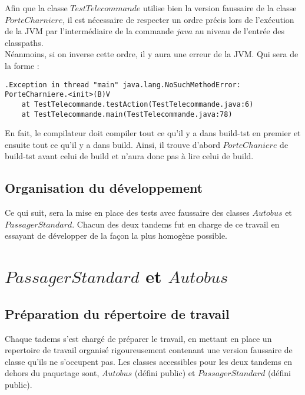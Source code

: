 \documentclass[a4paper,11pts]{article}
\begin{document}
Afin que la classe $TestTelecommande$ utilise bien la version faussaire de la classe $PorteCharniere$, il est nécessaire de respecter un ordre précis lors de l'exécution de la JVM par l'intermédiaire de la commande $java$ au niveau de l'entrée des classpaths. \\
Néanmoins, si on inverse cette ordre, il y aura une erreur de la JVM. Qui sera de la forme :
\begin{verbatim}
.Exception in thread "main" java.lang.NoSuchMethodError: PorteCharniere.<init>(B)V
	at TestTelecommande.testAction(TestTelecommande.java:6)
	at TestTelecommande.main(TestTelecommande.java:78)
\end{verbatim}
En fait, le compilateur doit compiler tout ce qu'il y a dans build-tst en premier et ensuite tout ce qu'il y a dans build. Ainsi, il trouve d'abord $PorteChaniere$ de build-tst avant celui de build et n'aura donc pas à lire celui de build.


\subsection{Organisation du développement}

Ce qui suit, sera la mise en place des tests avec faussaire des classes $Autobus$ et $PassagerStandard$. Chacun des deux tandems fut en charge de ce travail en essayant de développer de la façon la plus homogène possible.

\section{$PassagerStandard$ et $Autobus$}

\subsection{Préparation du répertoire de travail}

Chaque tadems s'est chargé de préparer le travail, en mettant en place un repertoire de travail organisé rigoureusement contenant une version faussaire de classe qu'ils ne s'occupent pas. Les classes accessibles pour les deux tandems en dehors du paquetage sont, $Autobus$ (défini public) et $PassagerStandard$ (défini public).\\
\end{document}
